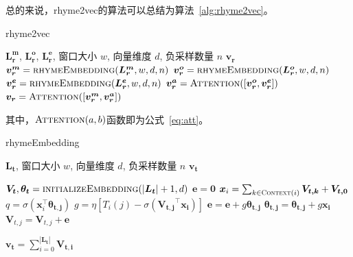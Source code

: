 总的来说，rhyme2vec的算法可以总结为算法~\ref{alg:rhyme2vec}。\par
\begin{algorithm}  
        \caption{rhyme2vec} 
        \label{alg:rhyme2vec} 
        \begin{algorithmic}[1] 
            \Require $\bm {L_r^m}$, $\bm {L_r^o}$, $\bm {L_r^e}$, 窗口大小 $w$, 向量维度 $d$, 负采样数量 $n$
            \Ensure $\bm {v_r}$
                \State $\bm {v_r^m} = \Call{rhymeEmbedding}{\bm {L_r^m}, w, d, n}$ 
                \State $\bm {v_r^o} = \Call{rhymeEmbedding}{\bm {L_r^o}, w, d, n}$ 
                \State $\bm {v_r^e} = \Call{rhymeEmbedding}{\bm {L_r^e}, w, d, n}$ 
                \State $\bm {v_r^a} = \Call{Attention}{{[\bm {v_r^o}, \bm {v_r^e}]}}$ 
                \State $\bm {v_r} = \Call{Attention}{{[\bm {v_r^m}, \bm {v_r^a}]}}$ 
                \State {}  
        \end{algorithmic}  
\end{algorithm}  
其中，$\Call{Attention}{a, b}$函数即为公式~\ref{eq:att}。

\begin{algorithm}  
        \caption{rhymeEmbedding} 
        \label{alg:rhymeembedding} 
        \begin{algorithmic}[1]  
        \Require $\bm {L_t}$, 窗口大小 $w$, 向量维度 $d$, 负采样数量 $n$
            \Ensure $\bm {v_t}$
            
              \State $\bm {V_t}, \bm {\theta_t} = \Call{initializeEmbedding}{|\bm {L_t}| + 1, d}$
                      \State $\bm e = \bm 0$
                      \State $\bm x_i = \sum_{k\in \Call{Context}{i}} \bm {V_{t, k}} + \bm {V_{t, 0}}$
                          \State $q = \sigma(\bm x_i^\top \bm {\theta_{t, j}})$
                          \State $g = \eta{[T_i(j)-\sigma(\bm {V_{t, j}}^\top \bm {x_i})]}$
                          \State $\bm e = \bm e + g\bm {\theta_{t, j}}$
                          \State $\bm {\theta_{t, j}} = \bm {\theta_{t, j}} + g\bm {x_i}$
                      \EndFor
                          \State $\bm V_{t, j} = \bm V_{t, j} + \bm e$
                      \EndFor

                  \EndFor
                \EndFor
                \State $\bm {v_t} = \sum_{i = 0}^{|\bm {L_t}|}\bm{V_{t, i}}$
                \State {} 
        \end{algorithmic}  
    \end{algorithm}  

